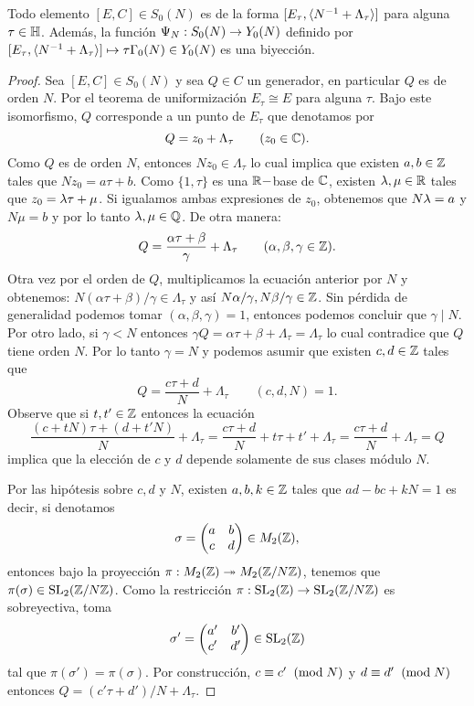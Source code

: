 \begin{lema}\label{lema:espacio_moduli_Y_0(N)}
	Todo elemento $[E,C]\in S_0(N)$ es de la forma $[E_\tau,\langle N^{-1}+\Lambda_\tau \rangle]$ para alguna $\tau\in\mathbb{H}$. Además, la función $\Psi_N:S_0(N)\rightarrow Y_0(N)$ definido por $[E_\tau,\langle N^{-1}+\Lambda_\tau \rangle]\mapsto \tau\Gamma_0(N)\in Y_0(N)$ es una biyección.
\end{lema}

\begin{proof}
Sea $[E,C]\in S_0(N)$ y sea $Q\in C$ un generador, en particular $Q$ es de orden $N$. Por el teorema de uniformización $E_\tau\cong E$ para alguna $\tau$. Bajo este isomorfismo, $Q$ corresponde a un punto de $E_\tau$ que denotamos por
\[	
	Q=z_0+\Lambda_\tau\qquad(z_0\in\mathbb{C}).
\]
Como $Q$ es de orden $N$, entonces $Nz_0\in\Lambda_\tau$ lo cual implica que existen $a,b\in\mathbb{Z}$ tales que $Nz_0=a\tau+b$. Como $\{1,\tau\}$ es una $\mathbb{R}-$base de $\mathbb{C}$, existen $\lambda,\mu\in\mathbb{R}$ tales que $z_0=\lambda\tau+\mu$. Si igualamos ambas expresiones de $z_0$, obtenemos que $N\lambda=a$ y $N\mu=b$ y por lo tanto $\lambda,\mu\in\mathbb{Q}$. De otra manera:
\[
	Q=\frac{\alpha\tau+\beta}{\gamma}+\Lambda_\tau\qquad(\alpha,\beta,\gamma\in\mathbb{Z}).
\]
Otra vez por el orden de $Q$, multiplicamos la ecuación anterior por $N$ y obtenemos: $N(\alpha\tau+\beta)/\gamma\in\Lambda_\tau$ y así $N\alpha/\gamma,N\beta/\gamma\in\mathbb{Z}$. Sin pérdida de generalidad podemos tomar $(\alpha,\beta,\gamma)=1$, entonces podemos concluir que $\gamma\mid N$. Por otro lado, si $\gamma<N$ entonces $\gamma Q=\alpha\tau+\beta+\Lambda_\tau=\Lambda_\tau$ lo cual contradice que $Q$ tiene orden $N$. Por lo tanto $\gamma=N$ y podemos asumir que existen $c,d\in\mathbb{Z}$ tales que
\[
	Q=\frac{c\tau+d}{N}+\Lambda_\tau\qquad(c,d,N)=1.
\]
Observe que si $t,t'\in\mathbb{Z}$ entonces la ecuación
\[
	\frac{(c+tN)\tau+(d+t'N)}{N}+\Lambda_\tau=
	\frac{c\tau+d}{N}+t\tau+t'+\Lambda_\tau=
	\frac{c\tau+d}{N}+\Lambda_\tau=Q
\]
implica que la elección de $c$ y $d$ depende solamente de sus clases módulo $N$.

Por las hipótesis sobre $c,d$ y $N$, existen $a,b,k\in\mathbb{Z}$ tales que $ad-bc+kN=1$ es decir, si denotamos
\[
	\sigma=\begin{pmatrix}a & b\\ c & d\end{pmatrix}\in M_2(\mathbb{Z}),
\]
entonces bajo la proyección $\pi:M_2(\mathbb{Z})\twoheadrightarrow M_2(\mathbb{Z}/N\mathbb{Z})$, tenemos que $\pi(\sigma)\in\mathrm{SL}_2(\mathbb{Z}/N\mathbb{Z})$. Como la restricción $\pi:\mathrm{SL}_2(\mathbb{Z})\rightarrow\mathrm{SL}_2(\mathbb{Z}/N\mathbb{Z})$ es sobreyectiva, toma $$\sigma'=\begin{pmatrix}a' & b'\\ c' & d'\end{pmatrix}\in\mathrm{SL}_2(\mathbb{Z})$$ tal que $\pi(\sigma')=\pi(\sigma)$. Por construcción, $c\equiv c'\;\;(\mathrm{mod}\; N)$ y $d\equiv d'\;\;(\mathrm{mod}\; N)$ entonces
$Q=(c'\tau+d')/N+\Lambda_{\tau}$.


\end{proof}
